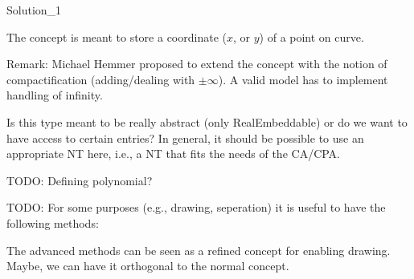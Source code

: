 \begin{ccRefConcept}{Solution_1}

\ccDefinition

The concept  is meant to store a coordinate ($x$, or $y$) of
a point on curve. 

\ccRefines

Remark: Michael Hemmer proposed to extend the concept  
with the notion of compactification (adding/dealing with $\pm\infty$). A
valid model has to implement handling of infinity.

\begin{ccAdvanced}

\ccTypes



\ccAccessFunctions

Is this type meant to be really abstract (only RealEmbeddable) or 
do we want to have access
to certain entries? In general, it should be possible to use an appropriate
NT here, i.e., a NT that fits the needs of the CA/CPA.

TODO: Defining polynomial?

TODO: For some purposes (e.g., drawing, seperation) it is useful to have the 
following methods:



The advanced methods can be seen as a refined concept for enabling drawing. 
Maybe, we can have it orthogonal to the normal concept.

\end{ccAdvanced}

\end{ccRefConcept}
